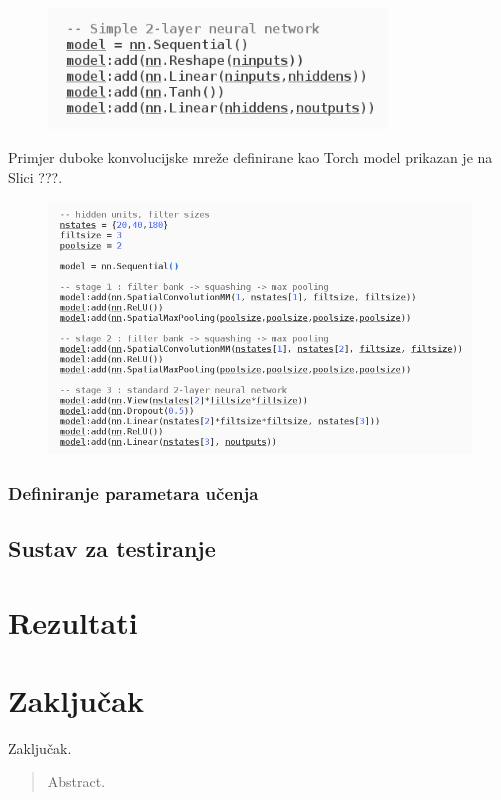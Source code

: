 \documentclass[lmodern, utf8, diplomski, numeric]{fer}
\begin{document}
\begin{figure}[ht!]
\centering
\includegraphics[width=9cm]{slike/nn_model.png}
\caption{}
\end{figure}

Primjer duboke konvolucijske mreže definirane kao Torch model prikazan je na Slici ???.

\begin{figure}[ht!]
\centering
\includegraphics[width=16cm]{slike/cnn_model.png}
\caption{}
\end{figure}

\subsection{Definiranje parametara učenja}




\section{Sustav za testiranje}



\chapter{Rezultati}

\chapter{Zaključak}
Zaključak.




\begin{sazetak}


\end{sazetak}

\begin{abstract}
Abstract.

\end{abstract}
\end{document}
